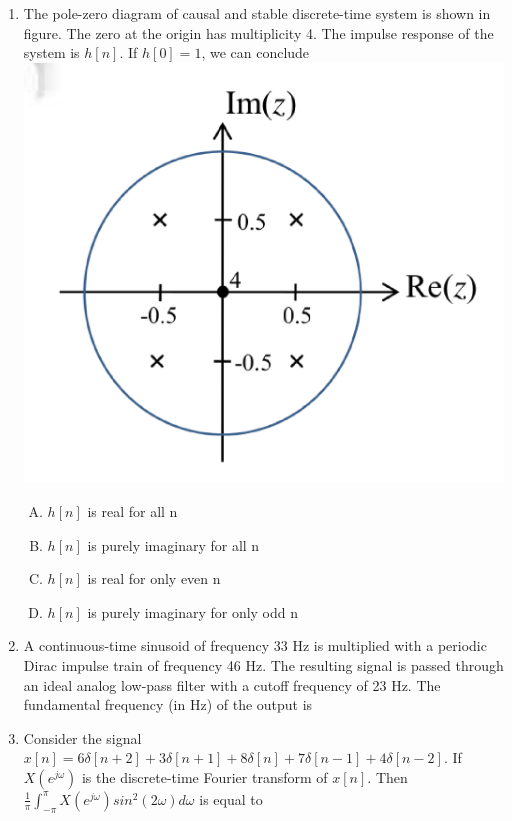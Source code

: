 \documentclass[journal,12pt,twocolumn]{IEEEtran}
\begin{document}
\begin{enumerate}
\item The pole-zero diagram of causal and stable discrete-time system is shown in figure. The zero at the origin has multiplicity 4. The impulse response of the system is $h[n]$. If $h[0]=1$, we can conclude\\
\includegraphics[scale=0.4]{fig16.eps}
\begin{enumerate}[(A)]

\setlength\itemsep{2em}

\item $h[n]$ is real for all n
\item $h[n]$ is purely imaginary for all n
\item $h[n]$ is real for only even n
\item $h[n]$ is purely imaginary for only odd n
\end{enumerate}




\item A continuous-time sinusoid of frequency 33 Hz is multiplied with a periodic Dirac impulse train of frequency 46 Hz. The resulting signal is passed through an ideal analog low-pass filter with a cutoff frequency of 23 Hz. The fundamental frequency (in Hz) of the output is \underline{\hspace{2cm}}

\item Consider the signal $x[n]=6\delta [n+2]+3\delta [n+1]+8\delta[n]+7\delta[n-1]+4\delta[n-2]$. If $X(e^{j\omega})$ is the discrete-time Fourier transform of $x[n]$. Then $\frac{1}{\pi}\int_{-\pi}^{\pi}X(e^{j\omega}) sin^{2}(2\omega)d\omega$ is equal to \underline{\hspace{2cm}}


\end{enumerate}
\end{document}
